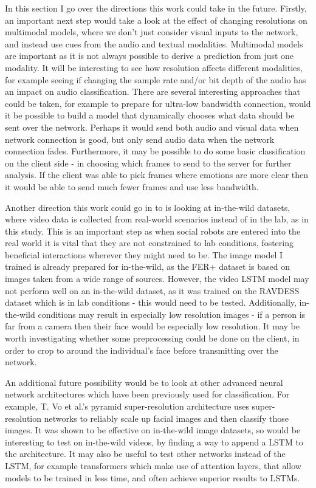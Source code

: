 \documentclass[sigconf]{acmart}
\begin{document}
{In this section I go over the directions this work could take in the future.
Firstly, an important next step would take a look at the effect of changing
resolutions on multimodal models, where
we don't just consider visual inputs to the network, and instead use cues from
the audio and textual modalities. Multimodal models are important as it
is not always possible to derive a prediction from just one modality. 
It will be interesting to see how
resolution affects different modalities, for example seeing if changing
the sample rate and/or bit depth of the audio has an impact on audio
classification. There are several interesting approaches that could be taken,
for example to prepare for ultra-low bandwidth connection, would it be
possible to build a model that dynamically chooses what data should be sent
over the network. Perhaps it would send both audio and visual data when
network connection is good, but only send audio data when the network
connection fades. Furthermore, it may be possible to do some basic
classification on the client side - in choosing which frames to send to the
server for further analysis. If the client was able to pick frames where
emotions are more clear then it would be able to send much fewer frames and
use less bandwidth.

Another direction this work could go in to is looking at in-the-wild datasets,
where video data is collected from real-world scenarios instead of in the lab, as in
this study. This is an important step as when social robots are entered into the
real world it is vital that they are not constrained to lab conditions, fostering 
beneficial interactions
wherever they might need to be. The image model I trained is already prepared
for in-the-wild, as the FER+ dataset is based on images taken from a wide
range of sources. However, the video LSTM model may not perform well on an
in-the-wild dataset, as it was trained on the RAVDESS dataset which is in lab conditions - this would need to
be tested. Additionally, in-the-wild conditions may result in especially low
resolution images - if a person is far from a camera then their face would be
especially low resolution. It may be worth investigating whether some
preprocessing could be done on the client, in order to crop to around the
individual's face before transmitting over the network.

An additional future possibility would be to look at other advanced neural
network architectures which have been previously used for classification.
For example, T. Vo et al.'s pyramid super-resolution architecture
\cite{vo2020pyramid} uses super-resolution networks to reliably scale 
up facial images and then classify those images. It was shown to be
effective on in-the-wild image datasets, so would be interesting to test on
in-the-wild videos, by finding a way to append a LSTM to the architecture. 
It may also be useful to test other networks instead of the LSTM, for
example transformers \cite{vaswani2017attention} which make use of attention
layers, that allow models to be trained in less time, and often achieve
superior results to LSTMs. 

}
\end{document}
